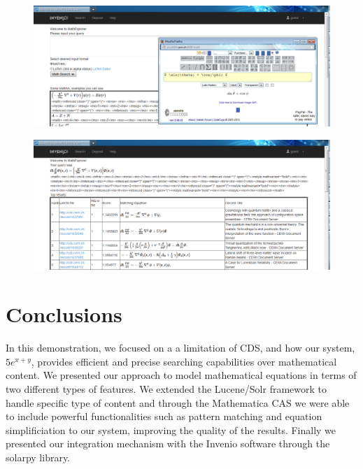 \documentclass{sig-alternate}
\begin{document}
\begin{figure}
\centering
\begin{minipage}{.27\textwidth}
  \includegraphics[width=0.9\linewidth]{images/figures/input_interface.png}
  \label{fig:test1}
\end{minipage}%
\begin{minipage}{.27\textwidth}
  \includegraphics[width=0.9\linewidth]{images/figures/results_interface.png}
  \label{fig:test2}
\end{minipage}
\end{figure}

\section{Conclusions}

In this demonstration, we focused on a a limitation of CDS, and how our system, $5e^{x+y}$, provides efficient and precise searching capabilities over mathematical content. We presented our approach to model mathematical equations in terms of two different types of features. We extended the Lucene/Solr framework to handle specific type of content and through the Mathematica CAS we were able to include powerful functionalities such as pattern matching and equation simplificiation to our system, improving the quality of the results. Finally we presented our integration mechanism with the Invenio software through the solarpy library.
\end{document}
